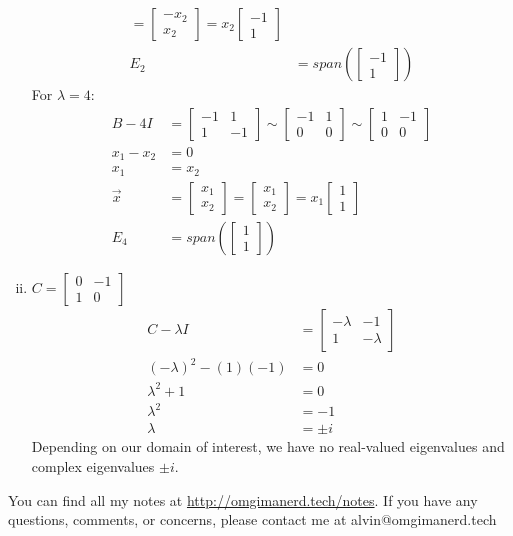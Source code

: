 \documentclass[letterpaper, 12pt]{math}
\begin{document}
\begin{enumerate}[(i)]
\begin{align*}
      = \begin{bmatrix}-x_2 \\ x_2\end{bmatrix}
      = x_2\begin{bmatrix}-1 \\ 1\end{bmatrix} \\
    E_2 &= span\left(\begin{bmatrix}-1 \\ 1\end{bmatrix}\right)
  \end{align*}
  For \( \lambda = 4 \):
  \begin{align*}
    B-4I &= \begin{bmatrix}-1 & 1 \\ 1 & -1\end{bmatrix}
      \sim \begin{bmatrix}-1 & 1 \\ 0 & 0\end{bmatrix}
      \sim \begin{bmatrix}1 & -1 \\ 0 & 0\end{bmatrix} \\
    x_1-x_2 &= 0 \\
    x_1 &= x_2 \\
    \vec{x} &= \begin{bmatrix}x_1 \\ x_2\end{bmatrix}
      = \begin{bmatrix}x_1 \\ x_2\end{bmatrix}
      = x_1\begin{bmatrix}1 \\ 1\end{bmatrix} \\
    E_4 &= span\left(\begin{bmatrix}1 \\ 1\end{bmatrix}\right)
  \end{align*}
  \item \( C = \begin{bmatrix}0 & -1 \\ 1 & 0\end{bmatrix} \)
  \begin{align*}
    C-\lambda I &= \begin{bmatrix}
      -\lambda & -1 \\
      1 & -\lambda
    \end{bmatrix} \\
    (-\lambda)^2-(1)(-1) &= 0 \\
    \lambda^2+1 &= 0 \\
    \lambda^2 &= -1 \\
    \lambda &= \pm i
  \end{align*}
  Depending on our domain of interest, we have no real-valued eigenvalues and
  complex eigenvalues \( \pm i \).
\end{enumerate}

\begin{center}
  You can find all my notes at \url{http://omgimanerd.tech/notes}. If you have
  any questions, comments, or concerns, please contact me at
  alvin@omgimanerd.tech
\end{center}
\end{document}
